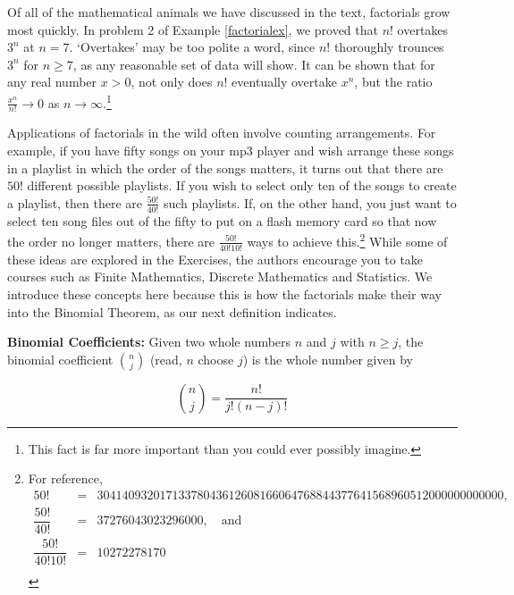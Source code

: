 Of all of the mathematical animals we have discussed in the text, factorials grow most quickly.  In problem 2 of Example \ref{factorialex}, we proved that $n!$ overtakes $3^{n}$ at $n=7$.  `Overtakes' may be too polite a word, since $n!$ thoroughly trounces $3^n$ for $n \geq 7$, as any reasonable set of data will show. It can be shown that for any real number $x > 0$, not only does $n!$ eventually overtake $x^n$, but the ratio $\frac{x^n}{n!} \rightarrow 0$ as $n \rightarrow \infty$.\footnote{This fact is far more important than you could ever possibly imagine.}  

\smallskip

Applications of factorials in the wild often involve counting arrangements. For example, if you have fifty songs on your mp3 player and wish arrange these songs in a playlist in which the order of the songs matters, it turns out that there are $50!$ different possible playlists.  If you wish to select only ten of the songs to create a playlist, then there are $\frac{50!}{40!}$ such playlists.  If, on the other hand, you just want to select ten song files out of the fifty to put on a flash memory card so that now the order no longer matters, there are $\frac{50!}{40! 10!}$ ways to achieve this.\footnote{For reference, \[\begin{array}{ccl} 50! & = &  30414093201713378043612608166064768844377641568960512000000000000, \\  \dfrac{50!}{40!} & = & 37276043023296000, \quad \text{and} \\ [5pt] \dfrac{50!}{40!  10!} & = & 10272278170 \\ \end{array}\]}  While some of these ideas are explored in the Exercises, the authors encourage you to take courses such as Finite Mathematics, Discrete Mathematics and Statistics. We introduce these concepts here because this is how the factorials make their way into the Binomial Theorem, as our next definition indicates.

\smallskip

\colorbox{ResultColor}{\bbm

\begin{defn} \label{binomialcoeff}  \textbf{Binomial Coefficients:}  Given two whole numbers $n$ and $j$ with $n \geq j$, the  binomial coefficient  {\boldmath $\displaystyle \binom{n}{j}$} (read, $n$ choose $j$) is the whole number given by

\[ \binom{n}{j} = \dfrac{n!}{j! (n-j)!} \]

\end{defn}
\ebm}

